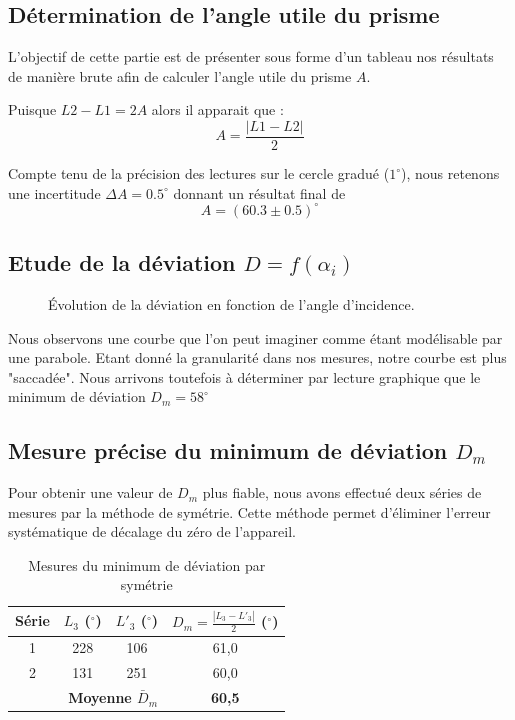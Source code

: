 \subsection{Détermination de l'angle utile du prisme}



L'objectif de cette partie est de présenter sous forme d'un tableau nos résultats de manière brute afin de calculer l'angle utile du prisme $A$.

Puisque \(L2 - L1 =  2A \) alors il apparait que :
\[A = \frac{\left | L1 - L2 \right |}{2} \]  


Compte tenu de la précision des lectures sur le cercle gradué ($1^{\circ}$), 
nous retenons une incertitude $\Delta A = 0.5^{\circ}$ donnant un résultat final de 
\[A = (60.3 \pm 0.5)^{\circ}\]

\subsection{Etude de la déviation \texorpdfstring{$D = f(\alpha_i)$}{D = f(alpha)}}


\begin{figure}[ht]
    \centering
    \caption{Évolution de la déviation en fonction de l'angle d'incidence.}
\end{figure}

Nous observons une courbe que l'on peut imaginer comme étant modélisable par une parabole. 
Etant donné la granularité dans nos mesures, notre courbe est plus "saccadée". 
Nous arrivons toutefois à déterminer par lecture graphique que le minimum de déviation 
$D_m = 58^{\circ}$ 

\subsection{Mesure précise du minimum de déviation \texorpdfstring{$D_m$}{Dm}}

Pour obtenir une valeur de $D_m$ plus fiable, nous avons effectué deux séries de mesures par la méthode de symétrie. Cette méthode permet d'éliminer l'erreur systématique de décalage du zéro de l'appareil.

\begin{table}[ht]
    \centering
    \caption{Mesures du minimum de déviation par symétrie}
    \begin{tabular}{|c|c|c|c|}
        \hline
        Série & $L_3$ ($^\circ$) & $L'_3$ ($^\circ$) & $D_m = \frac{|L_3 - L'_3|}{2}$ ($^\circ$) \\
        \hline
        1 & 228 & 106 & 61,0 \\
        2 & 131 & 251 & 60,0 \\
        \hline
        \multicolumn{3}{|r|}{\textbf{Moyenne $\bar{D}_m$}} & \textbf{60,5} \\
        \hline
    \end{tabular}
\end{table}

